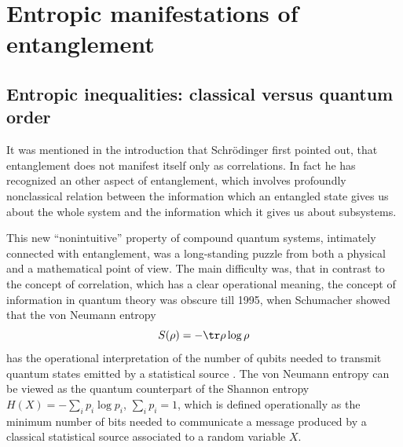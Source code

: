 \documentclass[twocolumn,aps,rmp]{revtex4}
\begin{document}
\section {Entropic manifestations of entanglement}
\label{sec:entropic}
\subsection { Entropic inequalities: classical versus quantum order}

It was mentioned in the introduction that Schr{\"o}dinger first
pointed out, that entanglement does not manifest itself only as
correlations. In fact he has recognized an other aspect of
entanglement, which involves profoundly nonclassical relation between
the information which an entangled state gives us about the whole
system and the information which it gives us about subsystems.

This new ``nonintuitive'' property of compound quantum systems,
intimately connected with entanglement, was a long-standing puzzle
from both a physical and a mathematical point of view. The main
difficulty was, that in contrast to the concept of correlation, which
has a clear operational meaning, the concept of information in quantum
theory was obscure till 1995, when Schumacher showed that the von
Neumann entropy
\begin{equation}
S(\rho) = - {\tr}\rho \log\rho \label{von}
\end{equation}
has the operational interpretation of the number of qubits needed to
transmit quantum states emitted by a statistical source \cite
{Schumacher1}. The von Neumann entropy can be viewed as the quantum
counterpart of the Shannon entropy $H(X)=-\sum_ip_i\log{p_i}$,
$\sum_ip_i=1$, which is defined operationally as the minimum number of
bits needed to communicate a message produced by a classical
statistical source associated to a random variable $X$.
\end{document}
